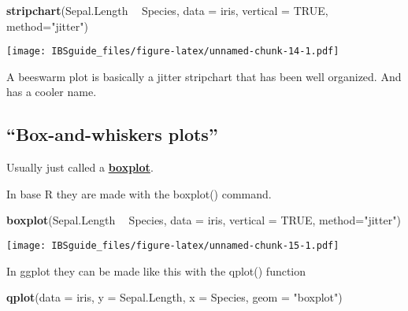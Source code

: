 \documentclass[]{book}
\newenvironment{Shaded}{\begin{snugshade}}{\end{snugshade}}
\newcommand{\KeywordTok}[1]{\textcolor[rgb]{0.13,0.29,0.53}{\textbf{#1}}}
\newcommand{\DataTypeTok}[1]{\textcolor[rgb]{0.13,0.29,0.53}{#1}}
\newcommand{\StringTok}[1]{\textcolor[rgb]{0.31,0.60,0.02}{#1}}
\newcommand{\OtherTok}[1]{\textcolor[rgb]{0.56,0.35,0.01}{#1}}
\newcommand{\OperatorTok}[1]{\textcolor[rgb]{0.81,0.36,0.00}{\textbf{#1}}}
\newcommand{\NormalTok}[1]{#1}
\theoremstyle{definition}
\theoremstyle{definition}
\theoremstyle{definition}
\theoremstyle{remark}
\begin{document}
\begin{Shaded}
\begin{Highlighting}[]
\KeywordTok{stripchart}\NormalTok{(Sepal.Length }\OperatorTok{~}\StringTok{ }\NormalTok{Species, }
           \DataTypeTok{data =}\NormalTok{ iris, }
           \DataTypeTok{vertical =} \OtherTok{TRUE}\NormalTok{, }
           \DataTypeTok{method=}\StringTok{"jitter"}\NormalTok{)}
\end{Highlighting}
\end{Shaded}

\texttt{[image: IBSguide\_files/figure-latex/unnamed-chunk-14-1.pdf]}

A beeswarm plot is basically a jitter stripchart that has been well
organized. And has a cooler name.

\subsection{\texorpdfstring{``Box-and-whiskers
plots''}{Box-and-whiskers plots}}\label{box-and-whiskers-plots}

Usually just called a
\href{https://en.wikipedia.org/wiki/Box_plot}{\textbf{boxplot}}.

In base R they are made with the boxplot() command.

\begin{Shaded}
\begin{Highlighting}[]
\KeywordTok{boxplot}\NormalTok{(Sepal.Length }\OperatorTok{~}\StringTok{ }\NormalTok{Species, }
           \DataTypeTok{data =}\NormalTok{ iris, }
           \DataTypeTok{vertical =} \OtherTok{TRUE}\NormalTok{, }
           \DataTypeTok{method=}\StringTok{"jitter"}\NormalTok{)}
\end{Highlighting}
\end{Shaded}

\texttt{[image: IBSguide\_files/figure-latex/unnamed-chunk-15-1.pdf]}

In ggplot they can be made like this with the qplot() function

\begin{Shaded}
\begin{Highlighting}[]
\KeywordTok{qplot}\NormalTok{(}\DataTypeTok{data =}\NormalTok{ iris, }
      \DataTypeTok{y =}\NormalTok{ Sepal.Length,}
      \DataTypeTok{x =}\NormalTok{ Species,}
      \DataTypeTok{geom =} \StringTok{"boxplot"}\NormalTok{)}
\end{Highlighting}
\end{Shaded}
\end{document}
